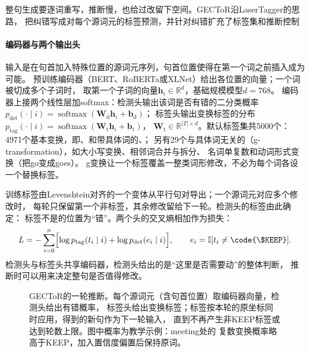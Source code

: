 整句生成要逐词重写，推断慢，也给过改留下空间。GECToR沿LaserTagger的思路，
把纠错写成对每个源词元的标签预测，并针对纠错扩充了标签集和推断控制

\paragraph{编码器与两个输出头}
输入是在句首加入特殊位置的源词元序列，句首位置使得在第一个词之前插入成为可能。
预训练编码器（BERT、RoBERTa或XLNet）给出各位置的向量；一个词被切成多个子词时，
取第一个子词的向量$\bm h_i\in\mathbb{R}^{d}$，基础规模模型$d=768$。
编码器上接两个线性层加softmax：检测头输出该词是否有错的二分类概率
$p_{\mathrm{det}}(\cdot\mid i)=\operatorname{softmax}(\bm W_{\mathrm{d}}\bm h_i+\bm b_{\mathrm{d}})$；
标签头输出变换标签的分布
$p_{\mathrm{tag}}(\cdot\mid i)=\operatorname{softmax}(\bm W_{\mathrm{t}}\bm h_i+\bm b_{\mathrm{t}})$，
$\bm W_{\mathrm{t}}\in\mathbb{R}^{|T|\times d}$。默认标签集共5000个：
4971个基本变换，即、和带具体词的、；
另有29个与具体词无关的（g-transformation），如大小写变换、相邻词合并与拆分、
名词单复数和动词形式变换（把go变成goes）。
g变换让一个标签覆盖一整类词形修改，不必为每个词各设一个替换标签。

训练标签由Levenshtein对齐的一个变体从平行句对导出；一个源词元对应多个修改时，
每轮只保留第一个非标签，其余修改留给下一轮。检测头的标签由此确定：
标签不是的位置为“错”。两个头的交叉熵相加作为损失：
\begin{equation}
  L=-\sum_{i=0}^{n}\Bigl[\log p_{\mathrm{tag}}(t_i\mid i)
  +\log p_{\mathrm{det}}(e_i\mid i)\Bigr],\qquad e_i=\mathbb{I}[t_i\neq\code{\$KEEP}].
  \label{eq:nlp-generation-gector-loss}
\end{equation}
检测头与标签头共享编码器，检测头给出的是“这里是否需要动”的整体判断，
推断时可以用来决定整句是否值得修改。

\begin{figure}[htbp]
  \centering
  
  \caption{GECToR的一轮推断。每个源词元（含句首位置）取编码器向量，检测头给出有错概率，
  标签头给出变换标签；标签按本轮的原坐标同时应用，得到的新句作为下一轮输入，
  直到不再产生非KEEP标签或达到轮数上限。图中概率为教学示例：meeting处的
  复数变换概率略高于KEEP，加入置信度偏置后保持原词。}
  \label{fig:nlp-generation-gector}
\end{figure}

